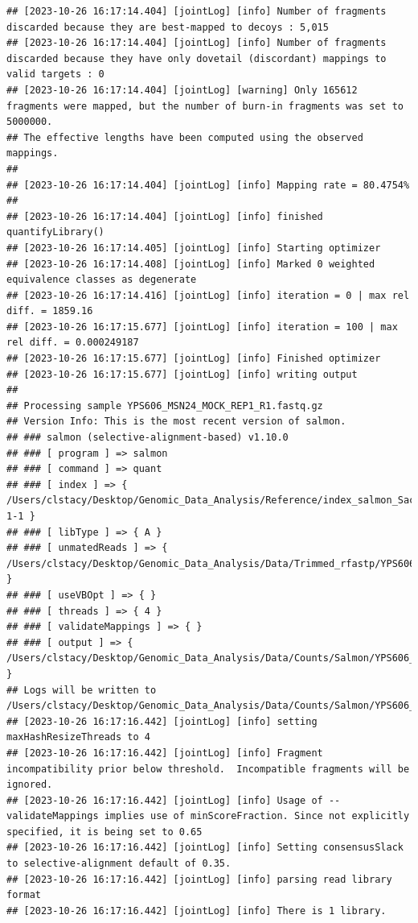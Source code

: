 \documentclass[
]{book}
\begin{document}
\begin{verbatim}
## [2023-10-26 16:17:14.404] [jointLog] [info] Number of fragments discarded because they are best-mapped to decoys : 5,015
## [2023-10-26 16:17:14.404] [jointLog] [info] Number of fragments discarded because they have only dovetail (discordant) mappings to valid targets : 0
## [2023-10-26 16:17:14.404] [jointLog] [warning] Only 165612 fragments were mapped, but the number of burn-in fragments was set to 5000000.
## The effective lengths have been computed using the observed mappings.
## 
## [2023-10-26 16:17:14.404] [jointLog] [info] Mapping rate = 80.4754%
## 
## [2023-10-26 16:17:14.404] [jointLog] [info] finished quantifyLibrary()
## [2023-10-26 16:17:14.405] [jointLog] [info] Starting optimizer
## [2023-10-26 16:17:14.408] [jointLog] [info] Marked 0 weighted equivalence classes as degenerate
## [2023-10-26 16:17:14.416] [jointLog] [info] iteration = 0 | max rel diff. = 1859.16
## [2023-10-26 16:17:15.677] [jointLog] [info] iteration = 100 | max rel diff. = 0.000249187
## [2023-10-26 16:17:15.677] [jointLog] [info] Finished optimizer
## [2023-10-26 16:17:15.677] [jointLog] [info] writing output 
## 
## Processing sample YPS606_MSN24_MOCK_REP1_R1.fastq.gz
## Version Info: This is the most recent version of salmon.
## ### salmon (selective-alignment-based) v1.10.0
## ### [ program ] => salmon 
## ### [ command ] => quant 
## ### [ index ] => { /Users/clstacy/Desktop/Genomic_Data_Analysis/Reference/index_salmon_Saccharomyces_cerevisiae.R64-1-1 }
## ### [ libType ] => { A }
## ### [ unmatedReads ] => { /Users/clstacy/Desktop/Genomic_Data_Analysis/Data/Trimmed_rfastp/YPS606_MSN24_MOCK_REP1_R1.fastq.gz }
## ### [ useVBOpt ] => { }
## ### [ threads ] => { 4 }
## ### [ validateMappings ] => { }
## ### [ output ] => { /Users/clstacy/Desktop/Genomic_Data_Analysis/Data/Counts/Salmon/YPS606_MSN24_MOCK_REP1_R1.fastq.gz_quant }
## Logs will be written to /Users/clstacy/Desktop/Genomic_Data_Analysis/Data/Counts/Salmon/YPS606_MSN24_MOCK_REP1_R1.fastq.gz_quant/logs
## [2023-10-26 16:17:16.442] [jointLog] [info] setting maxHashResizeThreads to 4
## [2023-10-26 16:17:16.442] [jointLog] [info] Fragment incompatibility prior below threshold.  Incompatible fragments will be ignored.
## [2023-10-26 16:17:16.442] [jointLog] [info] Usage of --validateMappings implies use of minScoreFraction. Since not explicitly specified, it is being set to 0.65
## [2023-10-26 16:17:16.442] [jointLog] [info] Setting consensusSlack to selective-alignment default of 0.35.
## [2023-10-26 16:17:16.442] [jointLog] [info] parsing read library format
## [2023-10-26 16:17:16.442] [jointLog] [info] There is 1 library.

\end{verbatim}
\end{document}
